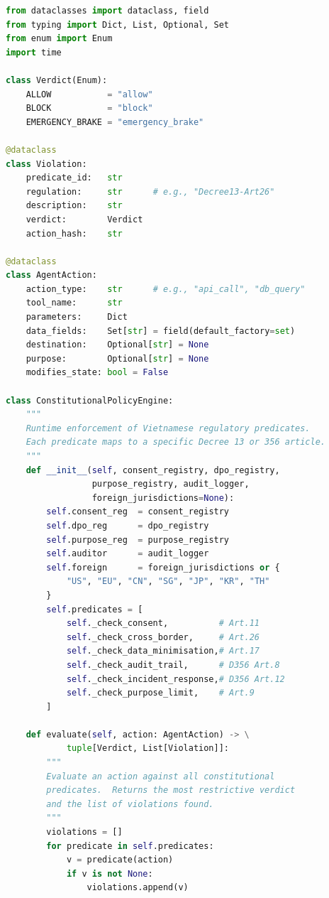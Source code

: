 \begin{lstlisting}[language=Python, style=pythonstyle,
  caption={Constitutional Policy Engine: translates Vietnamese
           regulatory articles into enforceable runtime constraints
           for autonomous AI agents.
           Each predicate returns a violation record or None.},
  label={lst:policy-engine}
]
from dataclasses import dataclass, field
from typing import Dict, List, Optional, Set
from enum import Enum
import time

class Verdict(Enum):
    ALLOW           = "allow"
    BLOCK           = "block"
    EMERGENCY_BRAKE = "emergency_brake"

@dataclass
class Violation:
    predicate_id:   str
    regulation:     str      # e.g., "Decree13-Art26"
    description:    str
    verdict:        Verdict
    action_hash:    str

@dataclass
class AgentAction:
    action_type:    str      # e.g., "api_call", "db_query"
    tool_name:      str
    parameters:     Dict
    data_fields:    Set[str] = field(default_factory=set)
    destination:    Optional[str] = None
    purpose:        Optional[str] = None
    modifies_state: bool = False

class ConstitutionalPolicyEngine:
    """
    Runtime enforcement of Vietnamese regulatory predicates.
    Each predicate maps to a specific Decree 13 or 356 article.
    """
    def __init__(self, consent_registry, dpo_registry,
                 purpose_registry, audit_logger,
                 foreign_jurisdictions=None):
        self.consent_reg  = consent_registry
        self.dpo_reg      = dpo_registry
        self.purpose_reg  = purpose_registry
        self.auditor      = audit_logger
        self.foreign      = foreign_jurisdictions or {
            "US", "EU", "CN", "SG", "JP", "KR", "TH"
        }
        self.predicates = [
            self._check_consent,          # Art.11
            self._check_cross_border,     # Art.26
            self._check_data_minimisation,# Art.17
            self._check_audit_trail,      # D356 Art.8
            self._check_incident_response,# D356 Art.12
            self._check_purpose_limit,    # Art.9
        ]

    def evaluate(self, action: AgentAction) -> \
            tuple[Verdict, List[Violation]]:
        """
        Evaluate an action against all constitutional
        predicates.  Returns the most restrictive verdict
        and the list of violations found.
        """
        violations = []
        for predicate in self.predicates:
            v = predicate(action)
            if v is not None:
                violations.append(v)


\end{lstlisting}
